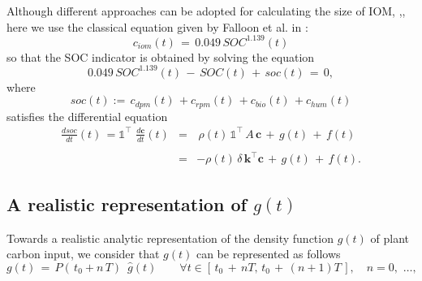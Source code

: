\noindent Although different approaches can be adopted for calculating the size of IOM, \cite{parshotammodelling},\cite{parshotam1999inert}, 
here we use the classical  equation  given by Falloon et al. in \cite{falloon1998estimating}: 
$$
c_{iom}(t)\,=\, 0.049\, SOC^{1.139}(t)
$$
so that the SOC indicator is obtained by solving the equation 
$$
 0.049\, SOC^{1.139}{(t)}\,-\, SOC{(t)}\, +\, soc(t)\, =\, 0,
$$
where
\begin{equation}\label{eq:SOC}
    soc(t):=\, c_{dpm}(t)\,+ c_{rpm}(t)\,+ c_{bio}(t)\,+ c_{hum}(t)
\end{equation}
satisfies the differential equation
 \begin{equation}\label{SOCmodel}
 \begin{array}{lcl}
  \displaystyle \frac{d soc}{dt}(t)\,     = \mathds{1}^\intercal \,\, \displaystyle \frac{d\mathbf{c}}{dt}(t) &=&\,\rho(t)\, \mathds{1}^\intercal \, A \, \mathbf{c} \, +\, g(t)\, +\, f(t)\\\\
      & =  & -\rho(t)\, \delta\, \mathbf{k}^\intercal \mathbf{c} \, +\, g(t)\, +\, f(t).
 \end{array}
 \end{equation}

\subsection{A realistic representation of $g(t)$}
\label{sec:2}
\noindent Towards a realistic analytic representation of the density function $g(t) $ of plant carbon  input, we consider that $g(t)$ can be represented as follows
\begin{equation}\label{gdiff}
    g(t)\, =\,\displaystyle P(\,t_0+n\,T)\,\,\, \hat g(t) \qquad  \forall t\in [\,t_0\,+\,nT,\, t_0\,+\,(n+1)T\,], \quad  n=0,\,\,\dots,
\end{equation}

